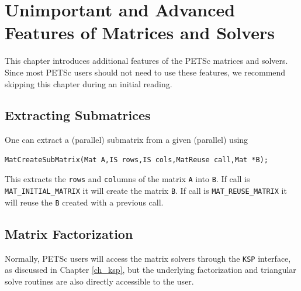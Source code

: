 {{{%

\cleardoublepage
\chapter{Unimportant and Advanced Features of Matrices and Solvers}
\label{ch_advanced}

This chapter introduces additional features of the PETSc matrices and solvers.
Since most PETSc users should not need to use these features,
we recommend skipping this chapter during an initial reading.

\medskip \medskip

\section{Extracting Submatrices} 

One can extract a (parallel) submatrix from a given (parallel) using
\begin{lstlisting}
MatCreateSubMatrix(Mat A,IS rows,IS cols,MatReuse call,Mat *B);
\end{lstlisting}
This extracts the \lstinline{rows} and \lstinline{col}umns of the matrix \lstinline{A} into \lstinline{B}. If
call is  \lstinline{MAT_INITIAL_MATRIX}  it will create the matrix
\lstinline{B}. If call is \lstinline{MAT_REUSE_MATRIX}  it will reuse the \lstinline{B}
created with a previous call.

\medskip \medskip

\section{Matrix Factorization} 
\label{sec_matfactor}

Normally, PETSc users will access the matrix solvers through the
\lstinline{KSP} interface, as discussed in Chapter \ref{ch_ksp}, but the underlying
factorization and triangular solve routines are also directly
accessible to the user.

\medskip \medskip

}}}

